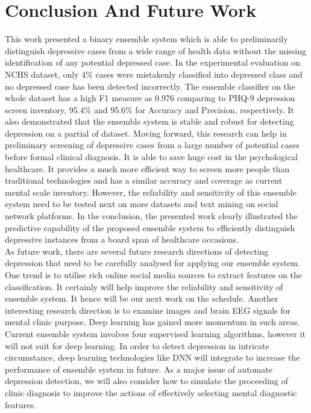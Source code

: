 \documentclass[12pt]{article}
\newlength{\defbaselineskip}
\newcommand{\setlinespacing}[1]%
           {\setlength{\baselineskip}{#1 \defbaselineskip}}
\begin{document}
\section{Conclusion And Future Work}
This work presented a binary ensemble system which is able to preliminarily distinguish depressive cases from a wide range of health data without the missing identification of any potential depressed case. In the experimental evaluation on NCHS dataset, only 4\% cases were mistakenly classified into depressed class and no depressed case has been detected incorrectly. The ensemble classifier on the whole dataset has a high F1 measure as 0.976 comparing to PHQ-9 depression screen inventory, 95.4\% and 95.6\% for Accuracy and Precision, respectively. It also demonstrated that the ensemble system is stable and robust for detecting depression on a partial of dataset. Moving forward, this research can help in preliminary screening of depressive cases from a large number of potential cases before formal clinical diagnosis. It is able to save huge cost in the psychological healthcare. It provides a much more efficient way to screen more people than traditional technologies and has a similar accuracy and coverage as current mental scale inventory. However, the reliability and sensitivity of this ensemble system need to be tested next on more datasets and text mining on social network platforms. In the conclusion, the presented work clearly illustrated the predictive capability of the proposed ensemble system to efficiently distinguish depressive instances from a board span of healthcare occasions.
\\

As future work, there are several future research directions of detecting depression that need to be carefully analysed for applying our ensemble system. One trend is to utilise rich online social media sources to extract features on the classification. It certainly will help improve the reliability and sensitivity of ensemble system. It hence will be our next work on the schedule.  Another interesting research direction is to examine images and brain EEG signals for mental clinic purpose. Deep learning has gained more momentum in such areas. Current ensemble system involves four supervised learning algorithms, however it will not suit for deep learning. In order to detect depression in intricate circumstance, deep learning technologies like DNN will integrate to increase the performance of ensemble system in future. As a major issue of automate depression detection, we will also consider how to simulate the proceeding of clinic diagnosis to improve the actions of effectively selecting mental diagnostic features. 

\goodbreak
\pagebreak
\setlinespacing{1.66}


\end{document}
